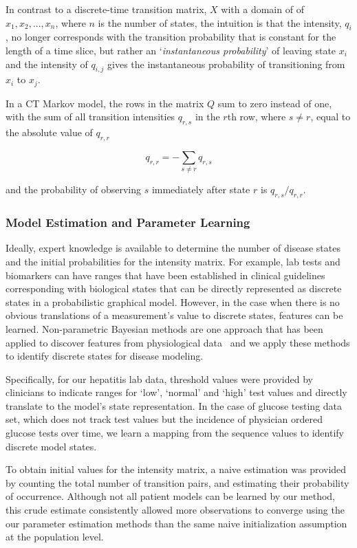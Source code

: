  In contrast to a discrete-time transition matrix, $X$ with a domain of of ${x_1,x_2,...,x_n}$, where $n$ is the number of states, the intuition is that the intensity, $q_{i}$, no longer corresponds with the transition probability that is constant for the length of a time slice, but rather an `\emph{instantaneous probability}' of leaving state $x_i$ and the intensity of $q_{i,j}$ gives the instantaneous probability of transitioning from $x_i$ to $x_j$.

In a CT Markov model, the rows in the matrix $Q$ sum to zero instead of one, with the sum of all transition intensities $q_{r,s}$ in the $r$th row, where $s\neq r$, equal to the absolute value of  $q_{r,r}$

$$q_{r,r} = -\sum_{s\neq r} q_{r,s}$$

\noindent and the probability of observing $s$ immediately after state $r$ is $q_{r,s}/q_{r,r}$.

\subsubsection{Model Estimation and Parameter Learning}
Ideally, expert knowledge is available to determine the number of disease states and the initial probabilities for the intensity matrix. For example, lab tests and biomarkers can have ranges that have been established in clinical guidelines corresponding with biological states that can be directly represented as discrete states in a probabilistic graphical model.  However, in the case when there is no obvious translations of a measurement's value to discrete states, features can be learned.  Non-parametric Bayesian methods are one approach that has been applied to discover features from physiological data~\cite{Saria09} and we apply these methods to identify discrete states for disease modeling.

Specifically, for our hepatitis lab data, threshold values were provided by clinicians to indicate ranges for `low', `normal' and `high' test values and directly translate to the model's state representation.  In the case of glucose testing data set, which does not track test values but the incidence of physician ordered glucose tests over time, we learn a mapping from the sequence values to identify discrete model states.

To obtain initial values for the intensity matrix, a naive estimation was provided by counting
the total number of transition pairs, and estimating their probability of occurrence. Although not
all patient models can be learned by our method, this crude estimate consistently allowed more observations to converge using the our parameter estimation methods than the same naive initialization assumption at the population level.

